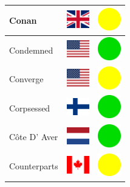 \documentclass[12pt, a4paper, twoside]{report}
\begin{document}
\begin{center}
\begin{longtable}{|p{5cm}|p{2cm}|p{2cm}|}
			Conan & \includegraphics[width=1cm]{4x3/gb} & \includegraphics[width=1cm]{likes/m} \\ \hline
			Condemned & \includegraphics[width=1cm]{4x3/us} & \includegraphics[width=1cm]{likes/y} \\ \hline
			Converge & \includegraphics[width=1cm]{4x3/us} & \includegraphics[width=1cm]{likes/m} \\ \hline
			Corpsessed & \includegraphics[width=1cm]{4x3/fi} & \includegraphics[width=1cm]{likes/y} \\ \hline
			Côte D' Aver & \includegraphics[width=1cm]{4x3/nl} & \includegraphics[width=1cm]{likes/y} \\ \hline
			Counterparts & \includegraphics[width=1cm]{4x3/ca} & \includegraphics[width=1cm]{likes/m} \\ \hline

\end{longtable}
\end{center}
\end{document}
